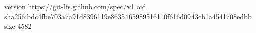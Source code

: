 version https://git-lfs.github.com/spec/v1
oid sha256:bdc4fbe703a7a91d8396119e8635465989516110f616d0943cb1a4541708edbb
size 4582
